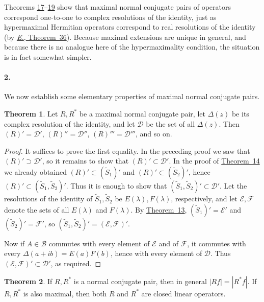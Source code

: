 \documentclass[
  paper=b5,
  twoside=true,
  fontsize=13pt,
  headings=normal,
  bookmarkpackage=false
]{scrartcl}
\theoremstyle{definition}
\newtheorem{theorem}{Theorem}
\newcommand{\TheoremRef}[1]{\hyperref[thm:#1]{Theorem~#1}}
\newcommand{\ErefText}[1]{\href{https://doi.org/10.1007/BF01782338}{#1}}
\begin{document}
Theorems \hyperref[thm:17]{17}--\hyperref[thm:19]{19} show that maximal normal conjugate pairs of operators
correspond one-to-one to complex resolutions of the identity, just as
hypermaximal Hermitian operators correspond to real resolutions of the
identity (by \ErefText{\emph{E.}, Theorem~36}).  Because maximal extensions are unique in
general, and because there is no analogue here of the hypermaximality
condition, the situation is in fact somewhat simpler.

\paragraph*{2.}\label{sec:max-normal-properties}
We now establish some elementary properties of maximal normal conjugate pairs.

\begin{theorem}\label{thm:20}
Let \(R,R^*\) be a maximal normal conjugate pair, let \(\Delta(z)\) be
its complex resolution of the identity, and let \(\mathcal D\) be the set
of all \(\Delta(z)\). Then \((R)'=\mathcal D'\), \((R)''=\mathcal D''\),
\((R)'''=\mathcal D'''\), and so on.
\end{theorem}

\begin{proof}
It suffices to prove the first equality. In the preceding proof we saw
that \((R)'\supset\mathcal D'\), so it remains to show that
\((R)'\subset\mathcal D'\). In the proof of \TheoremRef{14} we already
obtained \((R)'\subset(\widetilde S_1)'\) and
\((R)'\subset(\widetilde S_2)'\), hence
\((R)'\subset(\widetilde S_1,\widetilde S_2)'\).
Thus it is enough to show that
\((\widetilde S_1,\widetilde S_2)'\subset\mathcal D'\).
Let the resolutions of the identity of \(\widetilde S_1,\widetilde S_2\)
be \(E(\lambda),F(\lambda)\), respectively, and let
\(\mathcal E,\mathcal F\) denote the sets of all \(E(\lambda)\) and
\(F(\lambda)\). By \TheoremRef{13}, \((\widetilde S_1)'=\mathcal E'\) and
\((\widetilde S_2)'=\mathcal F'\), so
\((\widetilde S_1,\widetilde S_2)'=(\mathcal E,\mathcal F)'\).

Now if \(A\in\mathcal B\) commutes with every element of
\(\mathcal E\) and of \(\mathcal F\), it commutes with every
\(\Delta(a+ib)=E(a)F(b)\), hence with every element of \(\mathcal D\).
Thus \((\mathcal E,\mathcal F)'\subset\mathcal D'\), as required.
\end{proof}

\begin{theorem}\label{thm:21}
If \(R,R^*\) is a normal conjugate pair, then in general \(|Rf|=|R^*f|\).
If \(R,R^*\) is also maximal, then both \(R\) and \(R^*\) are
closed linear operators.
\end{theorem}
\end{document}

